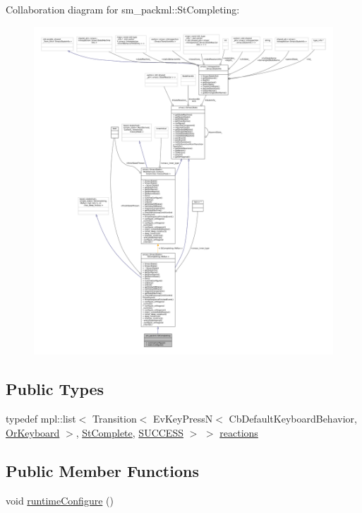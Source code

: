 Collaboration diagram for sm\+\_\+packml\+:\+:St\+Completing\+:
\nopagebreak
\begin{figure}[H]
\begin{center}
\leavevmode
\includegraphics[width=350pt]{structsm__packml_1_1StCompleting__coll__graph}
\end{center}
\end{figure}
\subsection*{Public Types}
\begin{DoxyCompactItemize}
\item 
typedef mpl\+::list$<$ Transition$<$ Ev\+Key\+PressN$<$ Cb\+Default\+Keyboard\+Behavior, \hyperlink{classsm__packml_1_1OrKeyboard}{Or\+Keyboard} $>$, \hyperlink{structsm__packml_1_1StComplete}{St\+Complete}, \hyperlink{classSUCCESS}{S\+U\+C\+C\+E\+SS} $>$ $>$ \hyperlink{structsm__packml_1_1StCompleting_afaaf701cb0e25176d5ccd07dbc5c0c02}{reactions}
\end{DoxyCompactItemize}
\subsection*{Public Member Functions}
\begin{DoxyCompactItemize}
\item 
void \hyperlink{structsm__packml_1_1StCompleting_a9fc40725c89293a94fbb3dda9a982aac}{runtime\+Configure} ()
\end{DoxyCompactItemize}
